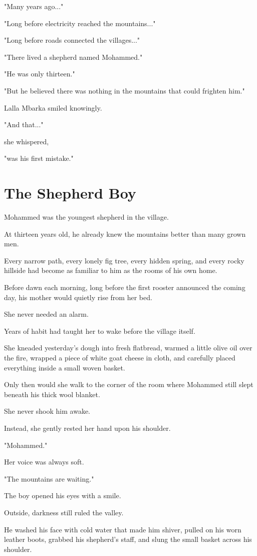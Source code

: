 \documentclass[12pt,openany]{book}
\begin{document}
"Many years ago..."

"Long before electricity reached the mountains..."

"Long before roads connected the villages..."

"There lived a shepherd named Mohammed."

"He was only thirteen."

"But he believed there was nothing in the mountains that could frighten him."

Lalla Mbarka smiled knowingly.

"And that..."

she whispered,

"was his first mistake."
\section*{The Shepherd Boy}

Mohammed was the youngest shepherd in the village.

At thirteen years old, he already knew the mountains better than many grown men.

Every narrow path, every lonely fig tree, every hidden spring, and every rocky hillside had become as familiar to him as the rooms of his own home.

Before dawn each morning, long before the first rooster announced the coming day, his mother would quietly rise from her bed.

She never needed an alarm.

Years of habit had taught her to wake before the village itself.

She kneaded yesterday's dough into fresh flatbread, warmed a little olive oil over the fire, wrapped a piece of white goat cheese in cloth, and carefully placed everything inside a small woven basket.

Only then would she walk to the corner of the room where Mohammed still slept beneath his thick wool blanket.

She never shook him awake.

Instead, she gently rested her hand upon his shoulder.

"Mohammed."

Her voice was always soft.

"The mountains are waiting."

The boy opened his eyes with a smile.

Outside, darkness still ruled the valley.

He washed his face with cold water that made him shiver, pulled on his worn leather boots, grabbed his shepherd's staff, and slung the small basket across his shoulder.
\end{document}

